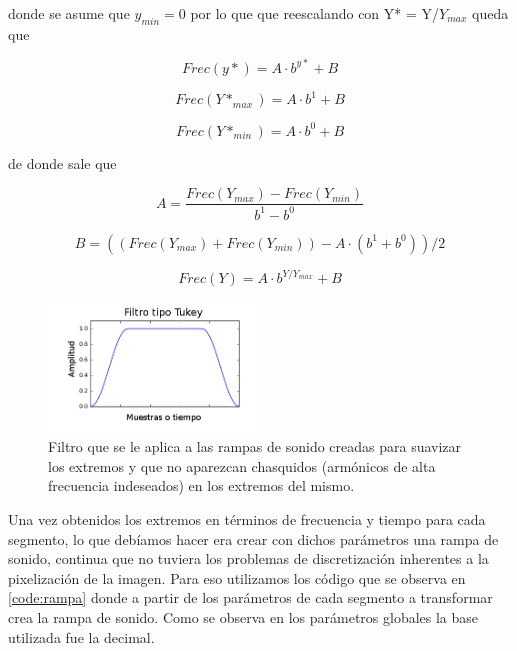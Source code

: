 \documentclass{article}
\begin{document}
    donde se asume que $y_{min}=0$ por lo que que reescalando con Y* = Y/$Y_{max}$ queda que
    
    \begin{equation*}
        Frec(y*) = A \cdot b^{y*} + B
    \end{equation*}
    
    \begin{equation*}
        Frec(Y*_{max}) = A \cdot b^{1} + B
    \end{equation*}
    
    \begin{equation*}
        Frec(Y*_{min}) = A \cdot b^{0} + B
    \end{equation*}
    
    de donde sale que 
    
    \begin{equation}
        \label{ec:yToF1}
        A = \frac{Frec(Y_{max}) - Frec(Y_{min}) }{b^1-b^0}
    \end{equation}
    
    \begin{equation}
        \label{ec:yToF2}
        B = ((Frec(Y_{max}) + Frec(Y_{min})) - A \cdot (b^1 + b^0)) / 2
    \end{equation}
    
    \begin{equation}
        \label{ec:yToF3}
        Frec(Y) = A \cdot b^{Y/Y_{max}} + B
    \end{equation}
    
    \begin{figure}
        \center
        \includegraphics[width=0.5\textwidth]{Imagenes/tukey.png}
        \caption{Filtro que se le aplica a las rampas de sonido creadas para suavizar los extremos y que no aparezcan chasquidos (armónicos de alta frecuencia indeseados) en los extremos del mismo.}
        \label{fig:tukey}
    \end{figure}
    
    Una vez obtenidos los extremos en términos de frecuencia y tiempo para cada segmento, lo que debíamos hacer era crear con dichos parámetros una rampa de sonido, continua que no tuviera los problemas de discretización inherentes a la pixelización de la imagen. Para eso utilizamos los código que se observa en \ref{code:rampa} donde a partir de los parámetros de cada segmento a transformar crea la rampa de sonido. Como se observa en los parámetros globales la base utilizada fue la decimal. 
    
\end{document}
